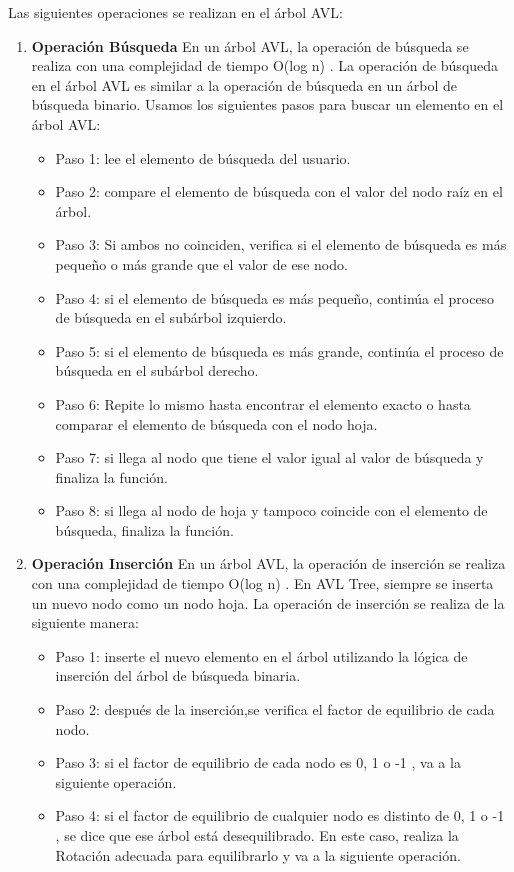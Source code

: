 \documentclass{article}
\begin{document}
Las siguientes operaciones se realizan en el árbol AVL:

	\begin{enumerate}

		\item \textbf{Operación Búsqueda}
	En un árbol AVL, la operación de búsqueda se realiza con una complejidad de tiempo O(log n) . La operación de búsqueda en el árbol AVL es similar a la operación de búsqueda en un árbol de búsqueda binario. Usamos los siguientes pasos para buscar un elemento en el árbol AVL:
		
		\begin{itemize}
		\item Paso 1: lee el elemento de búsqueda del usuario.
		\item Paso 2: compare el elemento de búsqueda con el valor del nodo raíz en el árbol.
		\item Paso 3: Si ambos no coinciden, verifica si el elemento de búsqueda es más pequeño o más grande que el valor de ese nodo.
		\item Paso 4: si el elemento de búsqueda es más pequeño, continúa el proceso de búsqueda en el subárbol izquierdo.
		\item Paso 5: si el elemento de búsqueda es más grande, continúa el proceso de búsqueda en el subárbol derecho.
		\item Paso 6: Repite lo mismo hasta encontrar el elemento exacto o hasta comparar el elemento de búsqueda con el nodo hoja.
		\item Paso 7: si llega al nodo que tiene el valor igual al valor de búsqueda y finaliza la función.
		\item Paso 8: si llega al nodo de hoja y tampoco coincide con el elemento de búsqueda, finaliza la función.
		\end{itemize}


		\item \textbf{Operación Inserción}
		En un árbol AVL, la operación de inserción se realiza con una complejidad de tiempo O(log n) . En AVL Tree, siempre se inserta un nuevo nodo como un nodo hoja. La operación de inserción se realiza de la siguiente manera:
		\begin{itemize}
		\item Paso 1: inserte el nuevo elemento en el árbol utilizando la lógica de inserción del árbol de búsqueda binaria.
		\item Paso 2: después de la inserción,se verifica el factor de equilibrio de cada nodo.
		\item Paso 3: si el factor de equilibrio de cada nodo es 0, 1 o -1 , va a la siguiente operación.
		\item Paso 4: si el factor de equilibrio de cualquier nodo es distinto de 0, 1 o -1 , se dice que ese árbol está desequilibrado. En este caso, realiza la Rotación adecuada para equilibrarlo y va a la siguiente operación.
				\end{itemize}
				

\end{enumerate}
\end{document}
